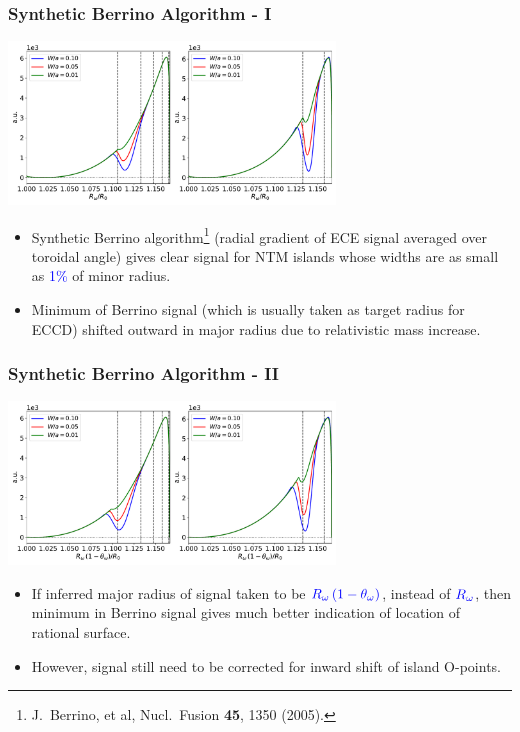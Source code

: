 \documentclass{beamer}
\begin{document}
\begin{frame}
\frametitle{Synthetic Berrino Algorithm - I}
 
\begin{center}
\includegraphics[width=0.65\textwidth]{../Fig17.pdf}
\end{center}

\begin{itemize}
\item Synthetic Berrino algorithm\footnote{J.~Berrino, et al, Nucl.\ Fusion {\bf 45}, 1350 (2005).} (radial gradient of ECE signal averaged over toroidal angle) gives clear signal for NTM islands whose widths are as small as \textcolor{blue}{1\%} of minor radius. 
\item Minimum of Berrino signal (which is usually taken as target radius for ECCD) shifted outward in major radius due to relativistic mass increase. 
\end{itemize}

\end{frame}

\begin{frame}
\frametitle{Synthetic Berrino Algorithm - II}
 
\begin{center}
\includegraphics[width=0.65\textwidth]{../Fig18.pdf}
\end{center}

\begin{itemize}
\item If inferred major radius of signal taken to be $\textcolor{blue}{R_\omega\,(1-\theta_\omega)}$, instead of $\textcolor{blue}{R_\omega}$,
then minimum in Berrino signal gives much better indication of location of rational surface. 
\item However, signal still need to be corrected for inward shift of island O-points. 
\end{itemize}

\end{frame}
\end{document}
